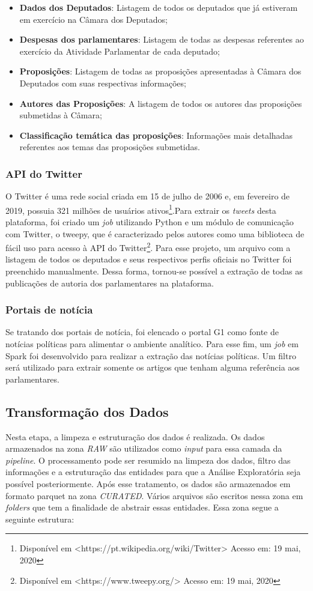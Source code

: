 \begin{itemize}
\item \textbf{Dados dos Deputados}: Listagem de todos os deputados que já estiveram em exercício na Câmara dos Deputados;
\item \textbf{Despesas dos parlamentares}: Listagem de todas as despesas referentes ao exercício da Atividade Parlamentar de cada deputado;
\item \textbf{Proposições}: Listagem de todas as proposições apresentadas à Câmara dos Deputados com suas respectivas informações;
\item \textbf{Autores das Proposições}: A listagem de todos os autores das proposições submetidas à Câmara;
\item \textbf{Classificação temática das proposições}: Informações mais detalhadas referentes aos temas das proposições submetidas.
\end{itemize}

\subsubsection{API do Twitter} O Twitter é uma rede social criada em 15 de julho de 2006 e, em fevereiro de 2019, possuia 321 milhões de usuários ativos\footnote{Disponível em <https://pt.wikipedia.org/wiki/Twitter> Acesso em: 19 mai, 2020}.Para extrair os \textit{tweets} desta plataforma, foi criado um \textit{job} utilizando Python e um módulo de comunicação com Twitter, o tweepy, que é caracterizado pelos autores como uma biblioteca de fácil uso para acesso à API do Twitter\footnote{Disponível em <https://www.tweepy.org/> Acesso em: 19 mai, 2020}. Para esse projeto, um arquivo com a listagem de todos os deputados e seus respectivos perfis oficiais no Twitter foi preenchido manualmente. Dessa forma, tornou-se possível a extração de todas as publicações de autoria dos parlamentares na plataforma.

\subsubsection{Portais de notícia} Se tratando dos portais de notícia, foi elencado o portal G1 como fonte de notícias políticas para alimentar o ambiente analítico. Para esse fim, um \textit{job} em Spark foi desenvolvido para realizar a extração das notícias políticas. Um filtro será utilizado para extrair somente os artigos que tenham alguma referência aos parlamentares. 

\subsection{Transformação dos Dados} Nesta etapa, a limpeza e estruturação dos dados é realizada. Os dados armazenados na zona \textit{RAW} são utilizados como \textit{input} para essa camada da \textit{pipeline}. O processamento pode ser resumido na limpeza dos dados, filtro das informações e a estruturação das entidades para que a Análise Exploratória seja possível posteriormente. Após esse tratamento, os dados são armazenados em formato parquet na zona \textit{CURATED}. Vários arquivos são escritos nessa zona em \textit{folders} que tem a finalidade de abstrair essas entidades. Essa zona segue a seguinte estrutura:

